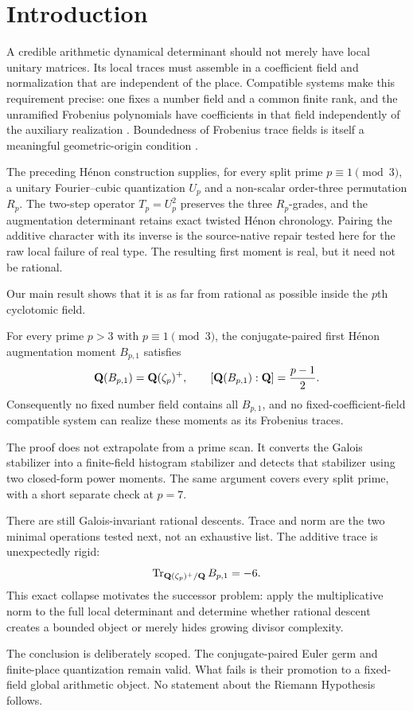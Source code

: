 \section{Introduction}

A credible arithmetic dynamical determinant should not merely have local
unitary matrices.  Its local traces must assemble in a coefficient field and
normalization that are independent of the place.  Compatible systems make
this requirement precise: one fixes a number field and a common finite rank,
and the unramified Frobenius polynomials have coefficients in that field
independently of the auxiliary realization \cite{Hui2025,Thorne2023}.
Boundedness of Frobenius trace fields is itself a meaningful geometric-origin
condition \cite{KrishnamoorthyLam2026}.

The preceding H\'enon construction supplies, for every split prime
$p\equiv1\pmod3$, a unitary Fourier--cubic quantization $U_p$ and a non-scalar
order-three permutation $R_p$.  The two-step operator $T_p=U_p^2$ preserves
the three $R_p$-grades, and the augmentation determinant retains exact
twisted H\'enon chronology.  Pairing the additive character with its inverse
is the source-native repair tested here for the raw local failure of real
type.  The resulting first moment is real, but it need not be rational.

Our main result shows that it is as far from rational as possible inside the
$p$th cyclotomic field.

\begin{theorem}\label{thm:main}
For every prime $p>3$ with $p\equiv1\pmod3$, the conjugate-paired first
H\'enon augmentation moment $B_{p,1}$ satisfies
\[
 \mathbf Q(B_{p,1})=\mathbf Q(\zeta_p)^+,
 \qquad
 [\mathbf Q(B_{p,1}):\mathbf Q]=\frac{p-1}{2}.
\]
Consequently no fixed number field contains all $B_{p,1}$, and no
fixed-coefficient-field compatible system can realize these moments as its
Frobenius traces.
\end{theorem}

The proof does not extrapolate from a prime scan.  It converts the Galois
stabilizer into a finite-field histogram stabilizer and detects that
stabilizer using two closed-form power moments.  The same argument covers
every split prime, with a short separate check at $p=7$.

There are still Galois-invariant rational descents.  Trace and norm are the
two minimal operations tested next, not an exhaustive list.  The additive
trace is unexpectedly rigid:
\[
 \operatorname{Tr}_{\mathbf Q(\zeta_p)^+/\mathbf Q}B_{p,1}=-6.
\]
This exact collapse motivates the successor problem: apply the multiplicative
norm to the full local determinant and determine whether rational descent
creates a bounded object or merely hides growing divisor complexity.

The conclusion is deliberately scoped.  The conjugate-paired Euler germ and
finite-place quantization remain valid.  What fails is their promotion to a
fixed-field global arithmetic object.  No statement about the Riemann
Hypothesis follows.
